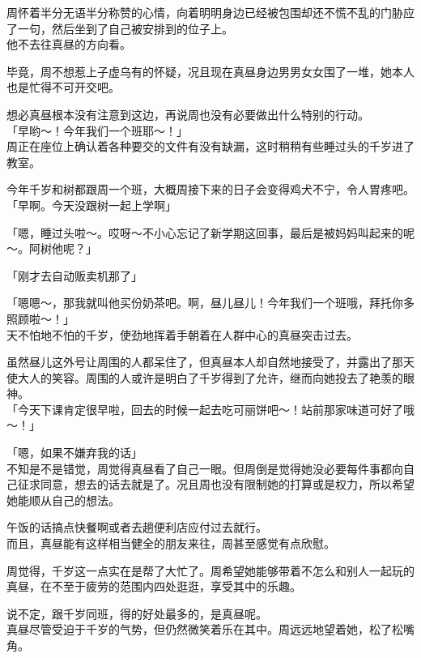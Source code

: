 周怀着半分无语半分称赞的心情，向着明明身边已经被包围却还不慌不乱的门胁应了一句，然后坐到了自己被安排到的位子上。\\

他不去往真昼的方向看。

毕竟，周不想惹上子虚乌有的怀疑，况且现在真昼身边男男女女围了一堆，她本人也是忙得不可开交吧。

想必真昼根本没有注意到这边，再说周也没有必要做出什么特别的行动。\\

「早哟～！今年我们一个班耶～！」\\

周正在座位上确认着各种要交的文件有没有缺漏，这时稍稍有些睡过头的千岁进了教室。

今年千岁和树都跟周一个班，大概周接下来的日子会变得鸡犬不宁，令人胃疼吧。\\

「早啊。今天没跟树一起上学啊」

「嗯，睡过头啦～。哎呀～不小心忘记了新学期这回事，最后是被妈妈叫起来的呢～。阿树他呢？」

「刚才去自动贩卖机那了」

「嗯嗯～，那我就叫他买份奶茶吧。啊，昼儿昼儿！今年我们一个班哦，拜托你多照顾啦～！」\\

天不怕地不怕的千岁，使劲地挥着手朝着在人群中心的真昼突击过去。

虽然昼儿这外号让周围的人都呆住了，但真昼本人却自然地接受了，并露出了那天使大人的笑容。周围的人或许是明白了千岁得到了允许，继而向她投去了艳羡的眼神。\\

「今天下课肯定很早啦，回去的时候一起去吃可丽饼吧～！站前那家味道可好了哦～！」

「嗯，如果不嫌弃我的话」\\

不知是不是错觉，周觉得真昼看了自己一眼。但周倒是觉得她没必要每件事都向自己征求同意，想去的话去就是了。况且周也没有限制她的打算或是权力，所以希望她能顺从自己的想法。

午饭的话搞点快餐啊或者去趟便利店应付过去就行。\\

而且，真昼能有这样相当健全的朋友来往，周甚至感觉有点欣慰。

周觉得，千岁这一点实在是帮了大忙了。周希望她能够带着不怎么和别人一起玩的真昼，在不至于疲劳的范围内四处逛逛，享受其中的乐趣。

说不定，跟千岁同班，得的好处最多的，是真昼呢。\\

真昼尽管受迫于千岁的气势，但仍然微笑着乐在其中。周远远地望着她，松了松嘴角。
